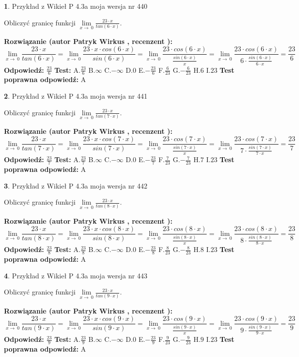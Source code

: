 \documentclass[12pt, a4paper]{article}
\theoremstyle{definition} %
\newtheorem{zad}{}
\newcommand{\zadStart}[1]{\begin{zad}#1\newline}
\newcommand{\zadStop}{\end{zad}}
\newcommand{\rozwStart}[2]{\noindent \textbf{Rozwiązanie (autor #1 , recenzent #2): }\newline}
\newcommand{\rozwStop}{\newline}
\newcommand{\odpStart}{\noindent \textbf{Odpowiedź:}\newline}
\newcommand{\odpStop}{\newline}
\newcommand{\testStart}{\noindent \textbf{Test:}\newline}
\newcommand{\testStop}{\newline}
\newcommand{\kluczStart}{\noindent \textbf{Test poprawna odpowiedź:}\newline}
\newcommand{\kluczStop}{\newline}
\begin{document}
\zadStart{Przykład z Wikieł P 4.3a moja wersja nr 440}


Obliczyć granicę funkcji $\lim\limits_{x\to\ 0}\frac{23 \cdot x}{tan(6 \cdot x)}$.
\zadStop
\rozwStart{Patryk Wirkus}{}
$$\lim\limits_{x\to\ 0}\frac{23 \cdot x}{tan(6 \cdot x)}=\lim\limits_{x\to\ 0}\frac{23 \cdot x \cdot cos(6 \cdot x)}{sin(6 \cdot x)}=\lim\limits_{x\to\ 0}\frac{23 \cdot cos(6 \cdot x)}{\frac{sin(6 \cdot x)}{x}}=\lim\limits_{x\to\ 0}\frac{23 \cdot cos(6 \cdot x)}{6 \cdot \frac{sin(6 \cdot x)}{6 \cdot x}} = \frac{23}{6}$$
\rozwStop
\odpStart
$\frac{23}{6}$
\odpStop
\testStart
A.$\frac{23}{6}$
B.$\infty$
C.$-\infty$
D.$0$
E.$-\frac{23}{6}$
F.$\frac{6}{23}$
G.$-\frac{6}{23}$
H.$6$
I.$23$
\testStop
\kluczStart
A
\kluczStop



\zadStart{Przykład z Wikieł P 4.3a moja wersja nr 441}


Obliczyć granicę funkcji $\lim\limits_{x\to\ 0}\frac{23 \cdot x}{tan(7 \cdot x)}$.
\zadStop
\rozwStart{Patryk Wirkus}{}
$$\lim\limits_{x\to\ 0}\frac{23 \cdot x}{tan(7 \cdot x)}=\lim\limits_{x\to\ 0}\frac{23 \cdot x \cdot cos(7 \cdot x)}{sin(7 \cdot x)}=\lim\limits_{x\to\ 0}\frac{23 \cdot cos(7 \cdot x)}{\frac{sin(7 \cdot x)}{x}}=\lim\limits_{x\to\ 0}\frac{23 \cdot cos(7 \cdot x)}{7 \cdot \frac{sin(7 \cdot x)}{7 \cdot x}} = \frac{23}{7}$$
\rozwStop
\odpStart
$\frac{23}{7}$
\odpStop
\testStart
A.$\frac{23}{7}$
B.$\infty$
C.$-\infty$
D.$0$
E.$-\frac{23}{7}$
F.$\frac{7}{23}$
G.$-\frac{7}{23}$
H.$7$
I.$23$
\testStop
\kluczStart
A
\kluczStop



\zadStart{Przykład z Wikieł P 4.3a moja wersja nr 442}


Obliczyć granicę funkcji $\lim\limits_{x\to\ 0}\frac{23 \cdot x}{tan(8 \cdot x)}$.
\zadStop
\rozwStart{Patryk Wirkus}{}
$$\lim\limits_{x\to\ 0}\frac{23 \cdot x}{tan(8 \cdot x)}=\lim\limits_{x\to\ 0}\frac{23 \cdot x \cdot cos(8 \cdot x)}{sin(8 \cdot x)}=\lim\limits_{x\to\ 0}\frac{23 \cdot cos(8 \cdot x)}{\frac{sin(8 \cdot x)}{x}}=\lim\limits_{x\to\ 0}\frac{23 \cdot cos(8 \cdot x)}{8 \cdot \frac{sin(8 \cdot x)}{8 \cdot x}} = \frac{23}{8}$$
\rozwStop
\odpStart
$\frac{23}{8}$
\odpStop
\testStart
A.$\frac{23}{8}$
B.$\infty$
C.$-\infty$
D.$0$
E.$-\frac{23}{8}$
F.$\frac{8}{23}$
G.$-\frac{8}{23}$
H.$8$
I.$23$
\testStop
\kluczStart
A
\kluczStop



\zadStart{Przykład z Wikieł P 4.3a moja wersja nr 443}


Obliczyć granicę funkcji $\lim\limits_{x\to\ 0}\frac{23 \cdot x}{tan(9 \cdot x)}$.
\zadStop
\rozwStart{Patryk Wirkus}{}
$$\lim\limits_{x\to\ 0}\frac{23 \cdot x}{tan(9 \cdot x)}=\lim\limits_{x\to\ 0}\frac{23 \cdot x \cdot cos(9 \cdot x)}{sin(9 \cdot x)}=\lim\limits_{x\to\ 0}\frac{23 \cdot cos(9 \cdot x)}{\frac{sin(9 \cdot x)}{x}}=\lim\limits_{x\to\ 0}\frac{23 \cdot cos(9 \cdot x)}{9 \cdot \frac{sin(9 \cdot x)}{9 \cdot x}} = \frac{23}{9}$$
\rozwStop
\odpStart
$\frac{23}{9}$
\odpStop
\testStart
A.$\frac{23}{9}$
B.$\infty$
C.$-\infty$
D.$0$
E.$-\frac{23}{9}$
F.$\frac{9}{23}$
G.$-\frac{9}{23}$
H.$9$
I.$23$
\testStop
\kluczStart
A
\kluczStop
\end{document}

